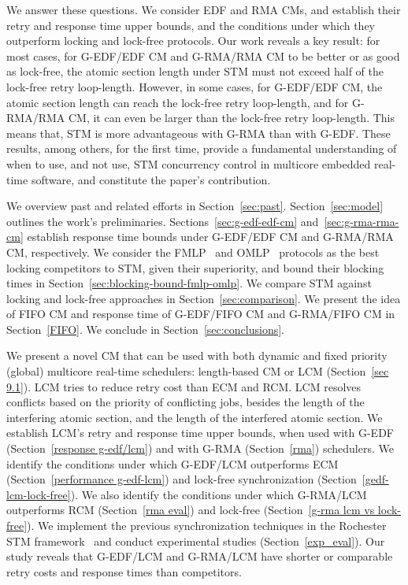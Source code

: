 \documentclass[a4paper,english]{article}
\begin{document}
We answer these questions. We consider EDF and RMA CMs, and establish their retry and response time upper bounds, and the conditions under which they outperform locking and lock-free protocols. Our work reveals a key result: for most cases, for G-EDF/EDF CM and G-RMA/RMA CM to be better or as good as lock-free, the atomic section length under STM must not exceed half of the lock-free retry loop-length. However, in some cases, for G-EDF/EDF CM, the atomic section length can reach the lock-free retry loop-length, and for G-RMA/RMA CM, it can even be larger than the lock-free retry loop-length.  This means that, STM is more advantageous with G-RMA than with G-EDF.
These results, among others, for the first time, provide a
fundamental understanding of when to use, and not use, STM concurrency
control in multicore embedded real-time software, and constitute the
paper's contribution. 

We overview past and related efforts in Section~\ref{sec:past}. Section~\ref{sec:model} outlines the work's preliminaries. Sections~\ref{sec:g-edf-edf-cm} and~\ref{sec:g-rma-rma-cm}
establish response time bounds under G-EDF/EDF CM and G-RMA/RMA CM, 
respectively. We consider the FMLP~\cite{key-4} and OMLP~\cite{key-3} protocols as the best locking competitors to STM, given their superiority, and bound their blocking times in Section~\ref{sec:blocking-bound-fmlp-omlp}. We compare STM against locking and lock-free approaches in Section~\ref{sec:comparison}. We present the idea of FIFO CM and response time of G-EDF/FIFO CM and G-RMA/FIFO CM in Section~\ref{FIFO}. We conclude in Section~\ref{sec:conclusions}.

We present a novel CM that can be used with both dynamic and fixed priority (global) multicore real-time schedulers: length-based CM or LCM (Section~\ref{sec 9.1}). LCM tries to reduce retry cost than ECM and RCM. LCM resolves conflicts based on the priority of conflicting jobs, besides the length of the interfering atomic section, and the length of the interfered atomic section.  We establish LCM's retry and response time upper bounds, when used with G-EDF (Section~\ref{response g-edf/lcm}) and with G-RMA (Section~\ref{rma}) schedulers. We identify the conditions under which G-EDF/LCM outperforms ECM (Section~\ref{performance g-edf-lcm}) and lock-free synchronization (Section~\ref{gedf-lcm-lock-free}). We also identify the conditions under which G-RMA/LCM outperforms RCM (Section~\ref{rma eval}) and lock-free (Section~\ref{g-rma lcm vs lock-free}).
%
We implement the previous synchronization techniques in the Rochester STM framework~\cite{marathe2006lowering} and conduct experimental studies (Section~\ref{exp_eval}). Our study reveals that G-EDF/LCM and G-RMA/LCM have shorter or comparable retry costs and response times than competitors. 
\end{document}
